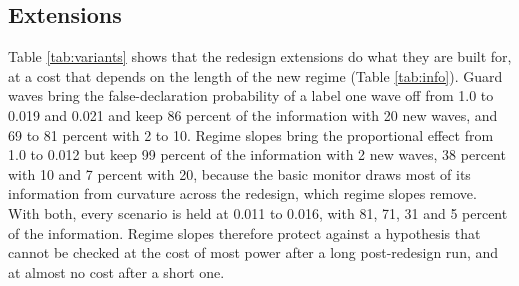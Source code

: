 \documentclass[Afour,sageh,times]{sagej}
\theoremstyle{definition}
\begin{document}
\subsection{Extensions}
\label{sec:extsim}

\begin{table}[t]
\small\centering
\caption{Monitor variants after a redesign, with 20 waves in the new regime (3,000 replications). The first four columns give the probability of a false declaration. Information is the final value of $B_n$ relative to the basic monitor under the additive shift.}
\label{tab:variants}

\end{table}

\begin{table}[t]
\small\centering
\caption{Information retained by the variants of Table \ref{tab:variants} under the additive shift, relative to the basic monitor, by the number of waves in the new regime.}
\label{tab:info}

\end{table}

\begin{table}[t]
\small\centering
\caption{Unknown-scale monitors against the known-scale monitor over 54 waves (1,500 replications; 1,000 for the mixture). The first block is the probability of a false declaration when the published standard errors are too small by the stated factor; the second block when the errors are dependent or the weights are wrong; the third block is the probability of a first declaration by the end of the series when the growth rate rises by the stated amount at the 25th wave. Monte Carlo standard errors are about 0.005 for the false-declaration entries near 0.03.}
\label{tab:unknown}

\end{table}

Table \ref{tab:variants} shows that the redesign extensions do what they are built for, at a cost that depends on the length of the new regime (Table \ref{tab:info}). Guard waves bring the false-declaration probability of a label one wave off from 1.0 to 0.019 and 0.021 and keep 86 percent of the information with 20 new waves, and 69 to 81 percent with 2 to 10. Regime slopes bring the proportional effect from 1.0 to 0.012 but keep 99 percent of the information with 2 new waves, 38 percent with 10 and 7 percent with 20, because the basic monitor draws most of its information from curvature across the redesign, which regime slopes remove. With both, every scenario is held at 0.011 to 0.016, with 81, 71, 31 and 5 percent of the information. Regime slopes therefore protect against a hypothesis that cannot be checked at the cost of most power after a long post-redesign run, and at almost no cost after a short one.
\end{document}
